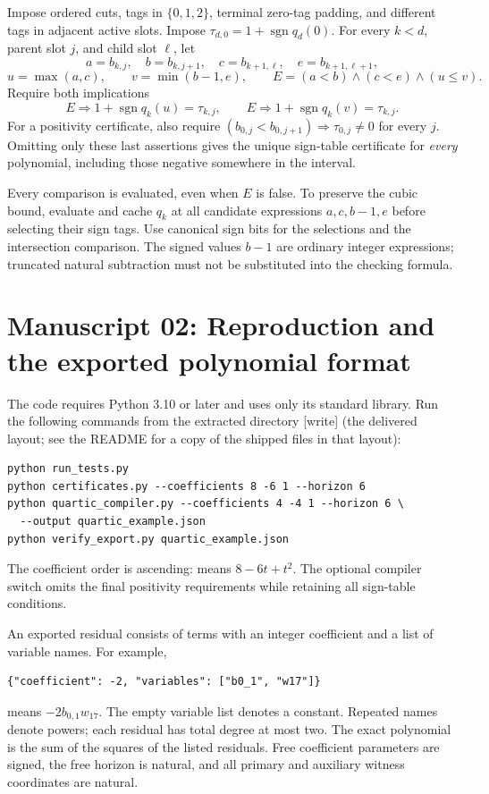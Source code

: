 \documentclass[11pt,a4paper]{article}
\theoremstyle{definition}
\theoremstyle{remark}
\newcommand{\code}[1]{\texttt{\detokenize{#1}}}
\newcommand{\sgn}{\operatorname{sgn}}
\newcommand{\wtag}{\textup{[write]}}%
\begin{document}
Impose ordered cuts, tags in $\{0,1,2\}$, terminal zero-tag padding, and
different tags in adjacent active slots. Impose
$\tau_{d,0}=1+\sgn q_d(0)$. For every $k<d$, parent slot $j$, and child
slot $\ell$, let
\[
 a=b_{k,j},\quad b=b_{k,j+1},\quad
 c=b_{k+1,\ell},\quad e=b_{k+1,\ell+1},
\]
\[
 u=\max(a,c),\qquad v=\min(b-1,e),\qquad
 E=(a<b)\wedge(c<e)\wedge(u\leq v).
\]
Require both implications
\[
 E\Longrightarrow 1+\sgn q_k(u)=\tau_{k,j},
 \qquad
 E\Longrightarrow 1+\sgn q_k(v)=\tau_{k,j}.
\]
For a positivity certificate, also require
$(b_{0,j}<b_{0,j+1})\Longrightarrow\tau_{0,j}\neq0$ for every $j$.
Omitting only these last assertions gives the unique sign-table
certificate for \emph{every} polynomial, including those negative
somewhere in the interval.

Every comparison is evaluated, even when $E$ is false. To preserve the
cubic bound, evaluate and cache $q_k$ at all candidate expressions
$a,c,b-1,e$ before selecting their sign tags. Use canonical sign bits for
the selections and the intersection comparison. The signed values
$b-1$ are ordinary integer expressions; truncated natural subtraction
must not be substituted into the checking formula.

\section{Manuscript 02: Reproduction and the exported polynomial format}
\label{cdc:pt:app:reproduction}
The code requires Python 3.10 or later and uses only its standard library.
Run the following commands from the extracted directory \wtag{} (the delivered layout; see the README for a copy of the shipped files in that layout):
\begin{lstlisting}
python run_tests.py
python certificates.py --coefficients 8 -6 1 --horizon 6
python quartic_compiler.py --coefficients 4 -4 1 --horizon 6 \
  --output quartic_example.json
python verify_export.py quartic_example.json
\end{lstlisting}
The coefficient order is ascending: \code{8 -6 1} means $8-6t+t^2$.
The optional compiler switch \code{--sign-table-only} omits the final
positivity requirements while retaining all sign-table conditions.

An exported residual consists of terms with an integer coefficient and a
list of variable names. For example,
\begin{lstlisting}
{"coefficient": -2, "variables": ["b0_1", "w17"]}
\end{lstlisting}
means $-2b_{0,1}w_{17}$. The empty variable list denotes a constant.
Repeated names denote powers; each residual has total degree at most two.
The exact polynomial is the sum of the squares of the listed residuals.
Free coefficient parameters are signed, the free horizon is natural, and
all primary and auxiliary witness coordinates are natural.
\end{document}
